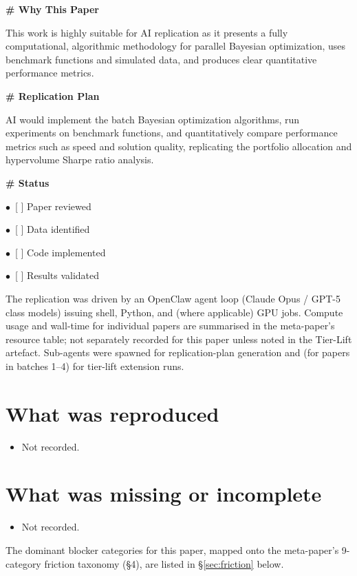 \documentclass[11pt]{article}
\begin{document}
\par\medskip\textbf{\# Why This Paper}\par
This work is highly suitable for AI replication as it presents a fully computational, algorithmic methodology for parallel Bayesian optimization, uses benchmark functions and simulated data, and produces clear quantitative performance metrics.

\par\medskip\textbf{\# Replication Plan}\par
AI would implement the batch Bayesian optimization algorithms, run experiments on benchmark functions, and quantitatively compare performance metrics such as speed and solution quality, replicating the portfolio allocation and hypervolume Sharpe ratio analysis.

\par\medskip\textbf{\# Status}\par
\par$\bullet$\ [ ] Paper reviewed
\par$\bullet$\ [ ] Data identified
\par$\bullet$\ [ ] Code implemented
\par$\bullet$\ [ ] Results validated
\normalsize

The replication was driven by an OpenClaw agent loop (Claude Opus / GPT-5 class models) issuing shell, Python, and (where applicable) GPU jobs. Compute usage and wall-time for individual papers are summarised in the meta-paper's resource table; not separately recorded for this paper unless noted in the Tier-Lift artefact. Sub-agents were spawned for replication-plan generation and (for papers in batches 1--4) for tier-lift extension runs.

\section{What was reproduced}
\begin{itemize}
\item Not recorded.
\end{itemize}

\section{What was missing or incomplete}
\begin{itemize}
\item Not recorded.
\end{itemize}
The dominant blocker categories for this paper, mapped onto the meta-paper's 9-category friction taxonomy (\S4), are listed in \S\ref{sec:friction} below.
\end{document}
